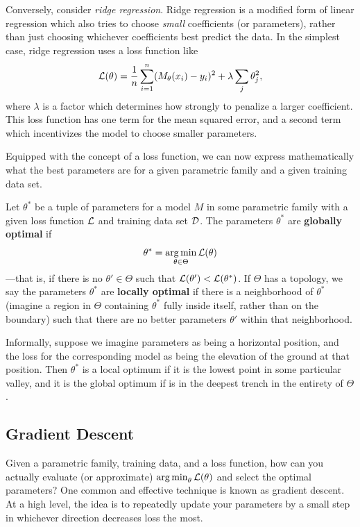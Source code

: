 \documentclass[12pt,twoside]{reedthesis}
\begin{document}
Conversely, consider \textit{ridge regression}. Ridge regression is a modified form of linear regression which also tries to choose \textit{small} coefficients (or parameters), rather than just choosing whichever coefficients best predict the data. In the simplest case, ridge regression uses a loss function like \begin{equation*}
    \mathcal{L}(\theta) = \dfrac{1}{n}\displaystyle\sum\limits_{i=1}^n(M_\theta(x_i) - y_i)^2 + \lambda \displaystyle\sum\limits_j \theta_j^2,
\end{equation*}
where $\lambda$ is a factor which determines how strongly to penalize a larger coefficient. This loss function has one term for the mean squared error, and a second term which incentivizes the model to choose smaller parameters.

Equipped with the concept of a loss function, we can now express mathematically what the best parameters are for a given parametric family and a given training data set.

\begin{definition}
    Let $\theta^*$ be a tuple of parameters for a model $M$ in some parametric family with a given loss function $\mathcal{L}$ and training data set $\mathcal{D}$. The parameters $\theta^*$ are \textbf{globally optimal} if \begin{equation*}
        \theta^* = \displaystyle\operatorname*{arg\,min}_{\theta \in \Theta} \mathcal{L}(\theta)
    \end{equation*}—that is, if there is no $\theta' \in \Theta$ such that $\mathcal{L}(\theta') < \mathcal{L}(\theta^*)$. If $\Theta$ has a topology, we say the parameters $\theta^*$ are \textbf{locally optimal} if there is a neighborhood of $\theta^*$ (imagine a region in $\Theta$ containing $\theta^*$ fully inside itself, rather than on the boundary) such that there are no better parameters $\theta'$ within that neighborhood.
\end{definition}
Informally, suppose we imagine parameters as being a horizontal position, and the loss for the corresponding model as being the elevation of the ground at that position. Then $\theta^*$ is a local optimum if it is the lowest point in some particular valley, and it is the global optimum if is in the deepest trench in the entirety of $\Theta$.

\subsection{Gradient Descent}
Given a parametric family, training data, and a loss function, how can you actually evaluate (or approximate) $\operatorname*{arg\,min}_{\theta} \mathcal{L}(\theta)$ and select the optimal parameters? One common and effective technique is known as gradient descent. At a high level, the idea is to repeatedly update your parameters by a small step in whichever direction decreases loss the most.
\end{document}
